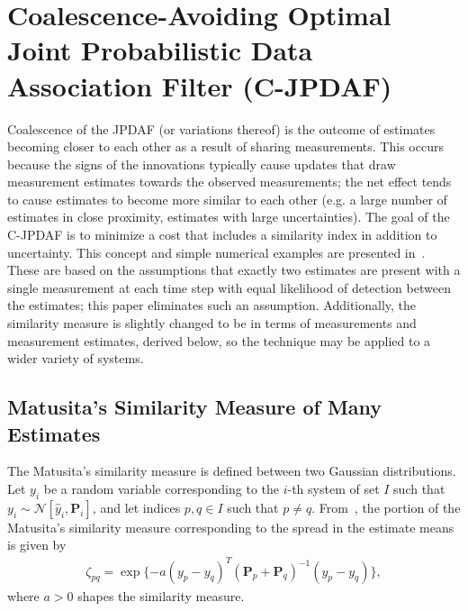 \documentclass[letterpaper, 10pt, conference]{ieeeconf}
\begin{document}
\section{Coalescence-Avoiding Optimal Joint Probabilistic Data Association Filter (C-JPDAF)}
\label{C-JPDAF}


Coalescence of the JPDAF (or variations thereof) is the outcome of estimates becoming closer to each other as a result of sharing measurements. This occurs because the signs of the innovations typically cause updates that draw measurement estimates towards the observed measurements; the net effect tends to cause estimates to become more similar to each other (e.g. a large number of estimates in close proximity, estimates with large uncertainties).
The goal of the C-JPDAF is to minimize a cost that includes a similarity index in addition to uncertainty.
This concept and simple numerical examples are presented in~\cite{KauLovLee14}.
These are based on the assumptions that exactly two estimates are present with a single measurement at each time step with equal likelihood of detection between the estimates; this paper eliminates such an assumption.
Additionally, the similarity measure is slightly changed to be in terms of measurements and measurement estimates, derived below, so the technique may be applied to a wider variety of systems.

\subsection{Matusita's Similarity Measure of Many Estimates}

The Matusita's similarity measure is defined between two Gaussian distributions.
Let $y_i$ be a random variable corresponding to the $i$-th system of set $I$ such that $y_i \sim \mathcal{N}[\hat y_i,{\mathbf P}_i]$, and let indices $p,q\in I$ such that $p\neq q$.
From~\cite{KauLovLee14}, the portion of the Matusita's similarity measure corresponding to the spread in the estimate means is given by
\begin{align}
\zeta_{pq}=\exp \{-a(y_{p}- y_{q})^T({\mathbf P}_{p}
+{\mathbf P}_{q})^{-1}(y_{p}-y_{q})\},\label{eqn:Mat2Est}
\end{align}
where $a>0$ shapes the similarity measure.
\end{document}
